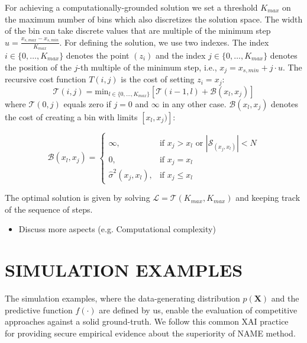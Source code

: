 \documentclass[twoside]{article}
\begin{document}
For achieving a computationally-grounded solution we set a threshold
\(K_{max}\) on the maximum number of bins which also discretizes the
solution space. The width of the bin can take discrete values that are
multiple of the minimum step
\(u = \frac{x_{s, max} - x_{s, min}}{K_{max}}\). For defining the
solution, we use two indexes. The index
\(i \in \{0, \ldots, K_{max}\}\) denotes the point \((z_i)\) and the
index \(j \in \{0, \ldots, K_{max}\} \) denotes the position of the
\(j\)-th multiple of the minimum step, i.e., 
\(x_j = x_{s,min} + j \cdot u\). The recursive cost function
\(T(i,j)\) is the cost of setting \(z_i=x_j\):
\begin{equation}
  \label{eq:recursive_cost}
  \mathcal{T}(i,j) = \mathrm{min}_{l \in \{0, \ldots, K_{max}\}} \left [ \mathcal{T}(i-1, l) + \mathcal{B}(x_l, x_j) \right ]
\end{equation}
%
where \(\mathcal{T}(0,j)\) equals zero if \(j=0\) and \(\infty\) in
any other case. \(\mathcal{B}(x_l, x_j)\) denotes the cost of creating a bin
with limits \([x_l, x_j)]\):

\begin{equation}
  \label{eq:cost_step}
  \mathcal{B}(x_l, x_j) = \begin{cases}
                            \infty, & \text{if $x_j > x_l$ or \(|\mathcal{S}_{(x_j, x_l)}| < N\)}\\
                            0, & \text{if $x_j = x_l$}\\
                            \hat{\sigma}^2(x_j, x_l), &\text{if $x_j \leq x_l$}
  \end{cases}
\end{equation}

The optimal solution is given by solving
\(\mathcal{L} = \mathcal{T}(K_{max}, K_{max})\) and keeping track of the sequence of
steps. 

\noindent

\begin{itemize}
\item Discuss more aspects (e.g. Computational complexity)
\end{itemize}

\section{SIMULATION EXAMPLES}
\label{sec:simulation-examples}

The simulation examples, where the data-generating distribution
\(p(\mathbf{X})\) and the predictive function \(f(\cdot)\) are defined
by us, enable the evaluation of competitive approaches against a solid
ground-truth. We follow this common XAI
practice~\citep{aas2021explaining, herbinger2022repid} for providing
secure empirical evidence about the superiority of NAME method.
\end{document}
